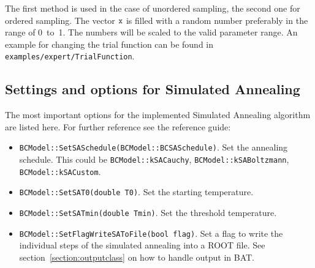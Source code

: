 \documentclass[11pt, a4paper]{article}
\begin{document}
The first method is used in the case of unordered sampling, the second
one for ordered sampling. The vector $\verb|x|$ is filled with a
random number preferably in the range of 0~to~1. The numbers will be
scaled to the valid parameter range. An example for changing the trial
function can be found in \verb|examples/expert/TrialFunction|.\\


\subsection{Settings and options for Simulated Annealing}
\label{section:settings:SA}

The most important options for the implemented Simulated Annealing
algorithm are listed here. For further reference see the reference
guide:
%
\begin{itemize}
\item \verb|BCModel::SetSASchedule(BCModel::BCSASchedule)|. Set the
  annealing schedule. This could be \verb|BCModel::kSACauchy|,
  \verb|BCModel::kSABoltzmann|, \verb|BCModel::kSACustom|.
\item \verb|BCModel::SetSAT0(double T0)|. Set the starting
  temperature.
\item \verb|BCModel::SetSATmin(double Tmin)|. Set the threshold
  temperature.
\item \verb|BCModel::SetFlagWriteSAToFile(bool flag)|. Set a flag to
 write the individual steps of the simulated annealing into a ROOT
 file. See section~\ref{section:outputclass} on how to handle output in
 BAT.
\end{itemize}



\end{document}
